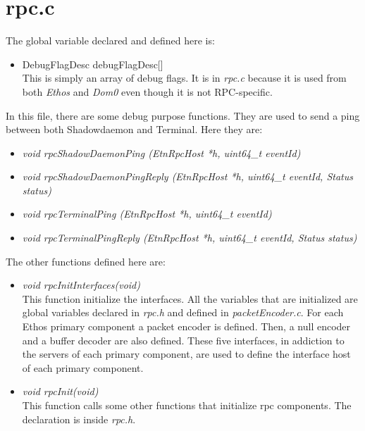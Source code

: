 \section{rpc.c}

The global variable declared and defined here is:

\begin{itemize}
\item DebugFlagDesc debugFlagDesc[]\\
This is simply an array of debug flags. It is in \emph{rpc.c} because it is used from both \emph{Ethos} and \emph{Dom0} even though it is not RPC-specific. 
\end{itemize}
In this file, there are some debug purpose functions. They are used to send a ping between both Shadowdaemon and Terminal. Here they are:

\begin{itemize}

\item \emph{void rpcShadowDaemonPing (EtnRpcHost *h, uint64\_t eventId)}

\item \emph{void rpcShadowDaemonPingReply (EtnRpcHost *h, uint64\_t eventId, Status status)}

\item \emph{void rpcTerminalPing (EtnRpcHost *h, uint64\_t eventId)}

\item \emph{void rpcTerminalPingReply (EtnRpcHost *h, uint64\_t eventId, Status status)}

\end{itemize}
The other functions defined here are:

\begin{itemize}

\item \emph{void rpcInitInterfaces(void)}\\
This function initialize the interfaces. All the variables that are initialized are global variables declared in \emph{rpc.h} and defined in \emph{packetEncoder.c}. For each Ethos primary component a packet encoder is defined. Then, a null encoder and a buffer decoder are also defined. These five interfaces, in addiction to the servers of each primary component, are used to define the interface host of each primary component.

\item \emph{void rpcInit(void)}\\
This function calls some other functions that initialize rpc components. The declaration is inside \emph{rpc.h}.
\end{itemize}